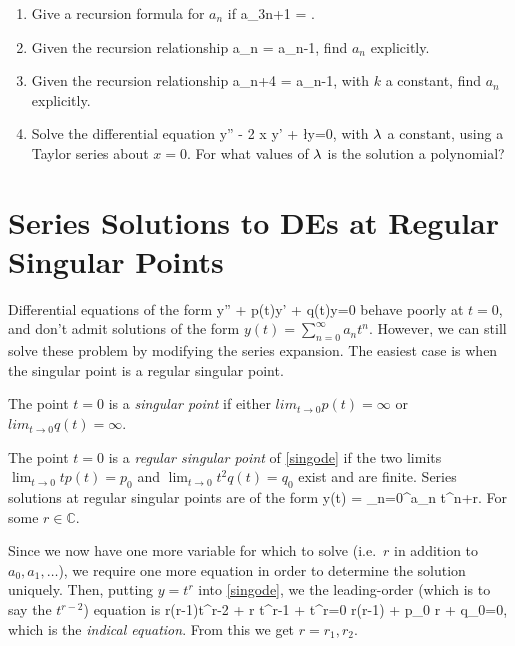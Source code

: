 \documentclass[12pt]{article}
\begin{document}
\begin{enumerate}
  \item
    Give a recursion formula for $a_n$ if 
    \be
    a_{3n+1} = .
    \ee

  \item
    Given the recursion relationship
    \be
    a_n = a_{n-1},
    \ee
    find $a_n$ explicitly.

  \item
    Given the recursion relationship
    \be
    a_{n+4} =  a_{n-1},
    \ee
    with $k$ a constant, find $a_n$ explicitly.

  \item Solve the differential equation
    \be
    y'' - 2 x y' + \l y=0,
    \ee
    with $\lambda$ a constant, using a Taylor series about $x=0$. For what values
    of $\lambda$ is the solution a polynomial?

\end{enumerate}
      

\newpage
\section{Series Solutions to DEs at Regular Singular Points}
Differential equations of the form
\be
\label{singode}
y'' + p(t)y' + q(t)y=0
\ee
behave poorly at $t=0$, and don't admit solutions of the form
$y(t) =\sum_{n=0}^\infty a_n t^n$. However, we can still solve these problem
by modifying the series expansion. The easiest case is when the singular
point is a regular singular point.

The point $t=0$ is a \emph{singular point} if either 
$lim_{t \rightarrow 0}p(t)=\infty$ or  $lim_{t \rightarrow 0}q(t)=\infty$.

The point $t=0$ is a \emph{regular singular point} of \eqref{singode} if
the two limits $\lim_{t\rightarrow 0} t p(t) =p_0$ 
and $\lim_{t\rightarrow 0} t^2 q(t) =q_0$
exist and are finite. Series solutions at regular singular points are of the
form
\be
y(t) = \sum_{n=0}^\infty a_n t^{n+r}.
\ee
For some $r\in\mathbb{C}$. 

Since we now have one more variable for which to solve (i.e.\ $r$ in addition
to $a_0, a_1,\dots$), we require one more equation in order to determine the
solution uniquely. Then, putting $y=t^r$ into \eqref{singode}, we the 
leading-order (which is to say the $t^{r-2}$) equation is 
\be
r(r-1)t^{r-2} +  r t^{r-1} +  t^r=0 
\implies r(r-1) + p_0 r  + q_0=0,
\ee
which is the \emph{indical equation}. From this we get $r=r_1, r_2$.
\end{document}
